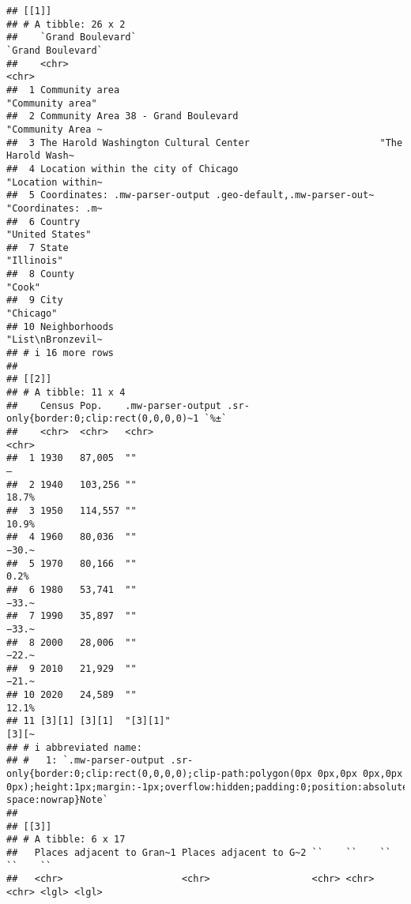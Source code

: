 \documentclass[
]{article}
\begin{document}
\begin{verbatim}
## [[1]]
## # A tibble: 26 x 2
##    `Grand Boulevard`                                           `Grand Boulevard`
##    <chr>                                                       <chr>            
##  1 Community area                                              "Community area" 
##  2 Community Area 38 - Grand Boulevard                         "Community Area ~
##  3 The Harold Washington Cultural Center                       "The Harold Wash~
##  4 Location within the city of Chicago                         "Location within~
##  5 Coordinates: .mw-parser-output .geo-default,.mw-parser-out~ "Coordinates: .m~
##  6 Country                                                     "United States"  
##  7 State                                                       "Illinois"       
##  8 County                                                      "Cook"           
##  9 City                                                        "Chicago"        
## 10 Neighborhoods                                               "List\nBronzevil~
## # i 16 more rows
## 
## [[2]]
## # A tibble: 11 x 4
##    Census Pop.    .mw-parser-output .sr-only{border:0;clip:rect(0,0,0,0)~1 `%±` 
##    <chr>  <chr>   <chr>                                                    <chr>
##  1 1930   87,005  ""                                                       —    
##  2 1940   103,256 ""                                                       18.7%
##  3 1950   114,557 ""                                                       10.9%
##  4 1960   80,036  ""                                                       −30.~
##  5 1970   80,166  ""                                                       0.2% 
##  6 1980   53,741  ""                                                       −33.~
##  7 1990   35,897  ""                                                       −33.~
##  8 2000   28,006  ""                                                       −22.~
##  9 2010   21,929  ""                                                       −21.~
## 10 2020   24,589  ""                                                       12.1%
## 11 [3][1] [3][1]  "[3][1]"                                                 [3][~
## # i abbreviated name:
## #   1: `.mw-parser-output .sr-only{border:0;clip:rect(0,0,0,0);clip-path:polygon(0px 0px,0px 0px,0px 0px);height:1px;margin:-1px;overflow:hidden;padding:0;position:absolute;width:1px;white-space:nowrap}Note`
## 
## [[3]]
## # A tibble: 6 x 17
##   Places adjacent to Gran~1 Places adjacent to G~2 ``    ``    ``    ``    ``   
##   <chr>                     <chr>                  <chr> <chr> <chr> <lgl> <lgl>

\end{verbatim}
\end{document}
